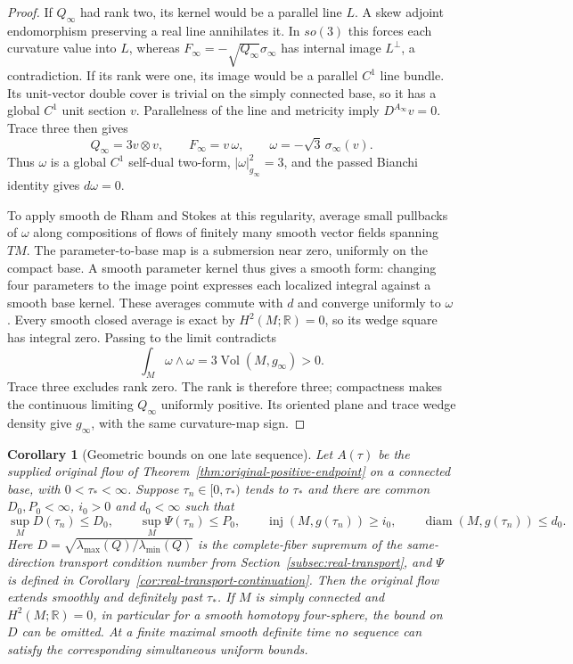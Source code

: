 \documentclass[11pt]{article}
\numberwithin{equation}{section}
\newtheorem{corollary}[theorem]{Corollary}
\theoremstyle{definition}
\theoremstyle{remark}
\begin{document}
\begin{proof}
If \(Q_\infty\) had rank two, its kernel would be a
parallel line \(L\). A skew adjoint endomorphism preserving
a real line annihilates it. In \(so(3)\) this forces each
curvature value into \(L\), whereas
\(F_\infty=-\sqrt{Q_\infty}\sigma_\infty\) has internal
image \(L^\perp\), a contradiction.
If its rank were one, its image would be a parallel
\(C^1\) line bundle. Its unit-vector double cover is
trivial on the simply connected base, so it has a
global \(C^1\) unit section \(v\). Parallelness of the
line and metricity imply \(D^{A_\infty}v=0\).
Trace three then gives
\[
 Q_\infty=3v\otimes v,\qquad
 F_\infty=v\,\omega,\qquad
 \omega=-\sqrt3\,\sigma_\infty(v).
\]
Thus \(\omega\) is a global \(C^1\) self-dual two-form,
\(|\omega|_{g_\infty}^2=3\), and the passed Bianchi
identity gives \(d\omega=0\).

To apply smooth de Rham and Stokes at this regularity,
average small pullbacks of \(\omega\) along compositions
of flows of finitely many smooth vector fields spanning
\(TM\). The parameter-to-base map is a submersion near
zero, uniformly on the compact base. A smooth parameter
kernel thus gives a smooth form: changing four parameters
to the image point expresses each localized integral
against a smooth base kernel. These averages commute
with \(d\) and converge uniformly to \(\omega\).
Every smooth closed average is exact by
\(H^2(M;\mathbb R)=0\), so its wedge square has integral
zero. Passing to the limit contradicts
\[
 \int_M\omega\wedge\omega
                   =3\operatorname{Vol}(M,g_\infty)>0.
\]
Trace three excludes rank zero. The rank is therefore
three; compactness makes the continuous limiting
\(Q_\infty\) uniformly positive. Its oriented plane
and trace wedge density give \(g_\infty\), with the
same curvature-map sign.
\end{proof}

\begin{corollary}[Geometric bounds on one late sequence]
\label{cor:geometric-sequence-continuation}
Let \(A(\tau)\) be the supplied original flow of
Theorem~\ref{thm:original-positive-endpoint} on a
connected base, with \(0<\tau_*<\infty\).
Suppose \(\tau_n\in[0,\tau_*)\) tends to \(\tau_*\)
and there are common \(D_0,P_0<\infty\), \(i_0>0\)
and \(d_0<\infty\) such that
\[
 \sup_M D(\tau_n)\le D_0,\qquad
 \sup_M\Psi(\tau_n)\le P_0,\qquad
 \operatorname{inj}(M,g(\tau_n))\ge i_0,\qquad
 \operatorname{diam}(M,g(\tau_n))\le d_0 .
\]
Here \(D=\sqrt{\lambda_{\max}(Q)/\lambda_{\min}(Q)}\)
is the complete-fiber supremum of the same-direction transport
condition number from Section~\ref{subsec:real-transport}, and \(\Psi\)
is defined in Corollary~\ref{cor:real-transport-continuation}.
Then the original flow extends smoothly and definitely
past \(\tau_*\). If \(M\) is simply connected and
\(H^2(M;\mathbb R)=0\), in particular for a smooth
homotopy four-sphere, the bound on \(D\) can be omitted.
At a finite maximal smooth definite time no sequence
can satisfy the corresponding simultaneous uniform bounds.
\end{corollary}
\end{document}
